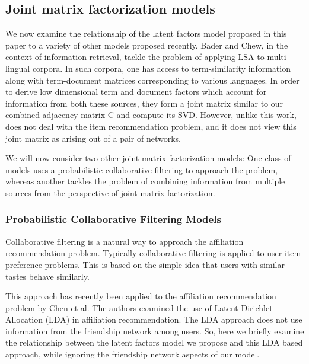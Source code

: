 \documentclass{sig-alternate}
\begin{document}
\subsection{Joint matrix factorization models}
We now examine the relationship of the latent factors model proposed in this paper to a variety of other models proposed recently. Bader and Chew\cite{baderChew08}, in the context of information retrieval, tackle the problem of applying LSA to multi-lingual corpora. In such corpora, one has access to term-similarity information along with term-document matrices corresponding to various languages. In order to derive low dimensional term and document factors which account for information from both these sources, they form a joint matrix similar to our combined adjacency matrix C and compute its SVD. However, unlike this work, \cite{baderChew08} does not deal with the item recommendation problem, and it does not view this joint matrix as arising out of a pair of networks.

We will now consider two other joint matrix factorization models: One class of models uses a probabilistic collaborative filtering to approach the problem, whereas another tackles the problem of combining information from multiple sources from the perspective of joint matrix factorization.

\subsubsection{Probabilistic Collaborative Filtering Models}
Collaborative filtering is a natural way to approach the affiliation recommendation problem. Typically collaborative filtering is applied to user-item preference problems. This is based on the simple idea that users with similar tastes behave similarly.

This approach has recently been applied to the affiliation recommendation problem by Chen et al\cite{GoogleCFLatent}. The authors examined the use of Latent Dirichlet Allocation (LDA) in affiliation recommendation. The LDA approach does not use information from the friendship network among users. So, here we briefly examine the relationship between the latent factors model we propose and this LDA based approach, while ignoring the friendship network aspects of our model.
\end{document}
